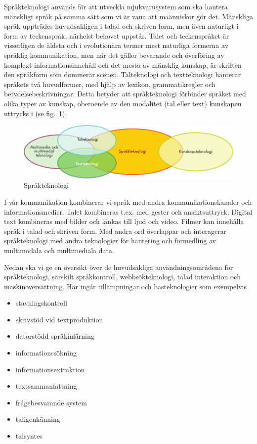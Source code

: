 \begin{multicols}{2}

Språkteknologi används för att utveckla mjukvarusystem som ska hantera
mänskligt språk på samma sätt som vi är vana att maänniskor gör
det. Mänskliga språk uppträder huvudsakligen i talad och skriven form,
men även naturligt i form av teckenspråk, närhelst behovet
uppstår. Talet och teckenspråket är visserligen de äldsta och i
evolutionära termer mest naturliga formerna av språklig kommunikation,
men när det gäller bevarande och överföring av komplext
informationsinnehåll och det mesta av mänsklig kunskap, är skriften
den språkform som dominerar scenen. Talteknologi och textteknologi
hanterar språkets två huvudformer, med hjälp av lexikon,
grammatikregler och betydelsebeskrivningar. Detta betyder att
språkteknologi förbinder språket med olika typer av kunskap, oberoende
av den modalitet (tal eller text) kunskapen uttrycks i (se fig.~\ref{fig:ltincontext_sv}).

\begin{figure}[htb]
  \center
  \includegraphics[width=\textwidth]{../_media/swedish/language_technologies}
  \caption{Språkteknologi}
  \label{fig:ltincontext_sv}
\end{figure}

I vår kommunikation kombinerar vi språk med andra
kommunikationskanaler och informationsmedier. Talet kombineras
t.ex. med gester och ansiktsuttryck. Digital text kombineras med
bilder och länkas till ljud och video. Filmer kan innehålla språk i
talad och skriven form. Med andra ord överlappar och interagerar
språkteknologi med andra teknologier för hantering och förmedling av
multimodala och multimediala data.

Nedan ska vi ge en översikt över de huvudsakliga användningsområdena
för språkteknologi, särskilt språkkontroll, webbsökteknologi, talad
interaktion och maskinöversättning. Här ingår tillämpningar och
basteknologier som exempelvis

\begin{itemize}[itemsep=0pt,parsep=0pt]
\item stavningskontroll
\item skrivstöd vid textproduktion
\item datorstödd språkinlärning
\item informationssökning
\item informationsextraktion
\item textsammanfattning
\item frågebesvarande system
\item taligenkänning
\item talsyntes
\end{itemize}


\end{multicols}
